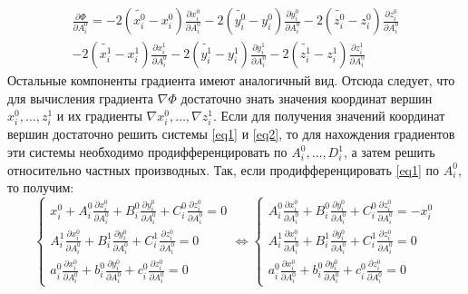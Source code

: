 \documentclass[14pt,fleqn,a4paper]{scrartcl}
\begin{document}
$$
\begin{matrix}
\frac{\partial \Phi}{\partial A_{i}^{0}}=-2(\widetilde{x_{i}^{0}}-x_{i}^{0})\frac{\partial x_{i}^{0}}{\partial A_{i}^{0}}-2(\widetilde{y_{i}^{0}}-y_{i}^{0})\frac{\partial y_{i}^{0}}{\partial A_{i}^{0}}-2(\widetilde{z_{i}^{0}}-z_{i}^{0})\frac{\partial z_{i}^{0}}{\partial A_{i}^{0}}\\
-2(\widetilde{x_{i}^{1}}-x_{i}^{1})\frac{\partial x_{i}^{1}}{\partial A_{i}^{0}}-2(\widetilde{y_{i}^{1}}-y_{i}^{1})\frac{\partial y_{i}^{1}}{\partial A_{i}^{0}}-2(\widetilde{z_{i}^{1}}-z_{i}^{1})\frac{\partial z_{i}^{1}}{\partial A_{i}^{0}}
\end{matrix}
$$
Остальные компоненты градиента имеют аналогичный вид. Отсюда следует, что для вычисления градиента $\nabla \Phi$ достаточно знать значения координат вершин $x_{i}^{0}, \hdots , z_{i}^{1}$ и их градиенты $\nabla x_{i}^{0}, \hdots, \nabla  z_{i}^{1}$. Если для получения значений координат вершин достаточно решить системы \ref{eq1} и  \ref{eq2}, то для нахождения градиентов эти системы необходимо продифференцировать по $A_{i}^{0},\hdots, D_{i}^{1}$, а затем решить относительно частных производных. Так, если продифференцировать \ref{eq1} по $A_{i}^{0}$, то получим:
$$
\begin{cases}
x_{i}^{0}+A_{i}^{0}\frac{\partial x_{i}^{0}}{\partial A_{i}^{0}}+B_{i}^{0}\frac{\partial y_{i}^{0}}{\partial A_{i}^{0}}+C_{i}^{0}\frac{\partial z_{i}^{0}}{\partial A_{i}^{0}}=0\\
A_{i}^{1}\frac{\partial x_{i}^{0}}{\partial A_{i}^{0}}+B_{i}^{1}\frac{\partial y_{i}^{0}}{\partial A_{i}^{0}}+C_{i}^{1}\frac{\partial z_{i}^{0}}{\partial A_{i}^{0}}=0\\
a_{i}^{0}\frac{\partial x_{i}^{0}}{\partial A_{i}^{0}}+b_{i}^{0}\frac{\partial y_{i}^{0}}{\partial A_{i}^{0}}+c_{i}^{0}\frac{\partial z_{i}^{0}}{\partial A_{i}^{0}}=0
\end{cases} 
\Leftrightarrow
\begin{cases}
A_{i}^{0}\frac{\partial x_{i}^{0}}{\partial A_{i}^{0}}+B_{i}^{0}\frac{\partial y_{i}^{0}}{\partial A_{i}^{0}}+C_{i}^{0}\frac{\partial z_{i}^{0}}{\partial A_{i}^{0}}=-x_{i}^{0}\\
A_{i}^{1}\frac{\partial x_{i}^{0}}{\partial A_{i}^{0}}+B_{i}^{1}\frac{\partial y_{i}^{0}}{\partial A_{i}^{0}}+C_{i}^{1}\frac{\partial z_{i}^{0}}{\partial A_{i}^{0}}=0\\
a_{i}^{0}\frac{\partial x_{i}^{0}}{\partial A_{i}^{0}}+b_{i}^{0}\frac{\partial y_{i}^{0}}{\partial A_{i}^{0}}+c_{i}^{0}\frac{\partial z_{i}^{0}}{\partial A_{i}^{0}}=0
\end{cases} 
$$
\end{document}
